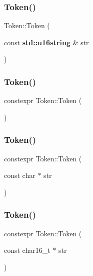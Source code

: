 \subsubsection{\texorpdfstring{Token()}{Token()}\hspace{0.1cm}{\footnotesize\ttfamily [1/10]}}
{\footnotesize\ttfamily Token\+::\+Token (\begin{DoxyParamCaption}\item[{const \textbf{ std\+::u16string} \&}]{str }\end{DoxyParamCaption})\hspace{0.3cm}{\ttfamily [inline]}}

\mbox{\label{class_token_aebaa2e391d98c62d1afbe02450e7f982}} 
\subsubsection{\texorpdfstring{Token()}{Token()}\hspace{0.1cm}{\footnotesize\ttfamily [2/10]}}
{\footnotesize\ttfamily constexpr Token\+::\+Token (\begin{DoxyParamCaption}{ }\end{DoxyParamCaption})\hspace{0.3cm}{\ttfamily [inline]}}

\mbox{\label{class_token_a344a67da48166ca3809eb253f0c60e64}} 
\subsubsection{\texorpdfstring{Token()}{Token()}\hspace{0.1cm}{\footnotesize\ttfamily [3/10]}}
{\footnotesize\ttfamily constexpr Token\+::\+Token (\begin{DoxyParamCaption}\item[{const char $\ast$}]{str }\end{DoxyParamCaption})\hspace{0.3cm}{\ttfamily [inline]}}

\mbox{\label{class_token_aeb65258a7c79cb54feb7633e89281897}} 
\subsubsection{\texorpdfstring{Token()}{Token()}\hspace{0.1cm}{\footnotesize\ttfamily [4/10]}}
{\footnotesize\ttfamily constexpr Token\+::\+Token (\begin{DoxyParamCaption}\item[{const char16\+\_\+t $\ast$}]{str }\end{DoxyParamCaption})\hspace{0.3cm}{\ttfamily [inline]}}

